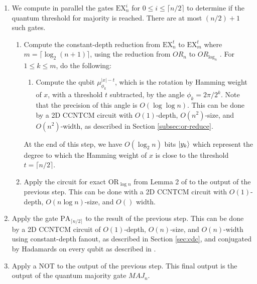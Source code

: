 \begin{enumerate}

\item
We compute in parallel the gates $\text{EX}^i_{n}$ for
$0 \le i \le \lceil n/2 \rceil$ to determine if the quantum
threshold for majority is reached. There are at most $(n/2) + 1$
such gates.

\begin{enumerate}
\item 
Compute the constant-depth reduction from $\text{EX}^t_{n}$ to
$\text{EX}^t_{m}$ where $m = \lceil \log_2(n+1) \rceil$, using
the reduction from $OR_n$ to $OR_{\log_n}$ \cite{Hoyer2002}.
For $1 \le k \le m$, do the following:

\begin{enumerate}
\item
Compute the qubit $\mu^{|x|-t}_{\phi_k}$, which is the rotation by Hamming 
weight of $x$, with a threshold $t$ subtracted, by the angle $\phi_k = 2\pi / 2^k$. Note that the precision
of this angle is $O(\log \log n)$. This can be done by a 2D CCNTCM circuit
with $O(1)$-depth, $O(n^2)$-size, and $O(n^2)$-width, as described in
Section \ref{subsec:or-reduce}.
\end{enumerate}

At the end of this step, we have $O(\log_2 n)$ bits $\left\vert{y_k}\right\rangle$ which 
represent the degree to which the Hamming weight of $x$ is close to the
threshold $t = \lceil n/2 \rceil$.

\item
Apply the circuit for exact $\text{OR}_{\log n}$ from Lemma 2 of
\cite{Takahashi2011} to the output of the previous step. This can
be done with a 2D CCNTCM circuit with $O(1)$-depth, $O(n \log n)$-size,
and $O()$ width.

\end{enumerate}

\item
Apply the gate $\text{PA}_{\lceil n/2 \rceil}$ to the result of
the previous step. This can be done by a 2D CCNTCM circuit of
$O(1)$-depth, $O(n)$-size, and $O(n)$-width using constant-depth
fanout, as described in Section \ref{sec:cdc}, and conjugated by
Hadamards on every qubit as described in \cite{Moore1998}.

\item
Apply a NOT to the output of the previous step. This final
output is the output of the quantum majority gate $MAJ_{n}$.

\end{enumerate}



